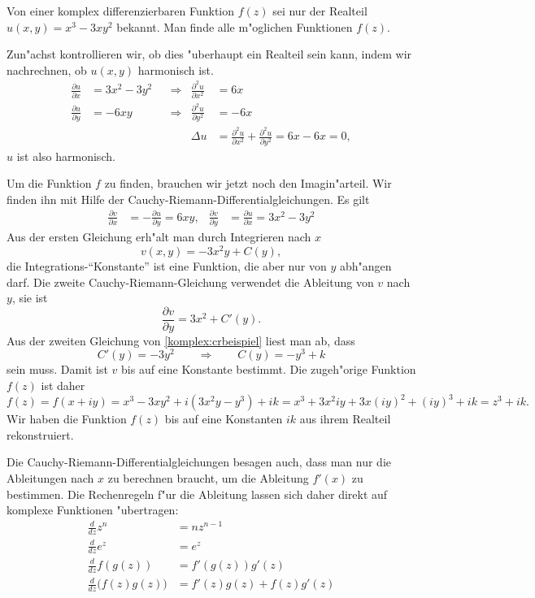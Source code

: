\begin{beispiel}
Von einer komplex differenzierbaren Funktion $f(z)$ sei nur der Realteil
$u(x,y)=x^3 -3xy^2$ bekannt.
Man finde alle m"oglichen Funktionen $f(z)$.

Zun"achst kontrollieren wir, ob dies "uberhaupt ein Realteil sein kann,
indem wir nachrechnen, ob $u(x,y)$ harmonisch ist.
\begin{equation*}
\begin{aligned}
\frac{\partial u}{\partial x}
&=
3x^2-3y^2
&&\Rightarrow&
\frac{\partial^2 u}{\partial x^2}
&=
6x
\\
\frac{\partial u}{\partial y}
&=
-6xy
&&\Rightarrow&
\frac{\partial^2 u}{\partial y^2}
&=
-6x
\\
&&&&\Delta u&=\frac{\partial^2u}{\partial x^2}+\frac{\partial^2u}{\partial y^2}=6x-6x=0,
\end{aligned}
\end{equation*}
$u$ ist also harmonisch.

Um die Funktion $f$ zu finden, brauchen wir jetzt noch den Imagin"arteil.
Wir finden ihn mit Hilfe der Cauchy-Riemann-Differentialgleichungen.
Es gilt
\begin{equation}
\begin{aligned}
\frac{\partial v}{\partial x}
&=
-\frac{\partial u}{\partial y}=6xy,
&
\frac{\partial v}{\partial y}
&=
\frac{\partial u}{\partial x}=3x^2-3y^2
\end{aligned}
\label{komplex:crbeispiel}
\end{equation}
Aus der ersten Gleichung erh"alt man durch Integrieren nach $x$ 
\[
v(x,y)=-3x^2y + C(y),
\]
die Integrations-``Konstante'' ist eine Funktion, die aber nur von $y$
abh"angen darf.
Die zweite Cauchy-Riemann-Gleichung verwendet die Ableitung von $v$ nach $y$,
sie ist
\[
\frac{\partial v}{\partial y}=3x^2+C'(y).
\]
Aus der zweiten Gleichung von \eqref{komplex:crbeispiel} liest man
ab, dass
\[
C'(y)=-3y^2
\qquad\Rightarrow\qquad
C(y)=-y^3+k
\]
sein muss.
Damit ist $v$ bis auf eine Konstante bestimmt.
Die zugeh"orige Funktion $f(z)$ ist daher
\[
f(z)=f(x+iy)=x^3-3xy^2+i(3x^2y-y^3)+ik
=x^3 + 3x^2iy + 3x(iy)^2+(iy)^3+ik=z^3+ik.
\]
Wir haben die Funktion $f(z)$ bis auf eine Konstanten $ik$ 
aus ihrem Realteil rekonstruiert.
\end{beispiel}

Die Cauchy-Riemann-Differentialgleichungen besagen auch, dass man nur
die Ableitungen nach $x$ zu berechnen braucht, um die Ableitung $f'(x)$
zu bestimmen.
Die Rechenregeln f"ur die Ableitung lassen sich daher direkt auf
komplexe Funktionen "ubertragen:
\begin{align*}
\frac{d}{dz}z^n
&=
nz^{n-1}
\\
\frac{d}{dz}e^z
&=
e^z
\\
\frac{d}{dz}f(g(z))
&=
f'(g(z)) g'(z)
\\
\frac{d}{dz}\bigl(f(z)g(z)\bigr)
&=
f'(z)g(z)+f(z)g'(z)
\end{align*}

